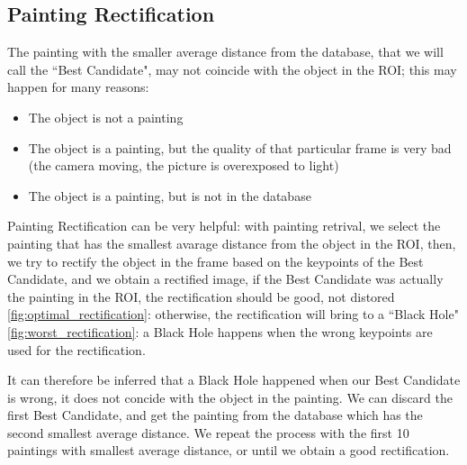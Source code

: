 \documentclass[10pt,twocolumn,letterpaper]{article}
\begin{document}
\subsection{Painting Rectification}
The painting with the smaller average distance from the database, that we will call the ``Best Candidate", may not coincide with the object in the ROI; this may happen for many reasons:
\begin{itemize}
  \item The object is not a painting
  \item The object is a painting, but the quality of that particular frame is very bad (the camera moving, the picture is overexposed to light)
  \item The object is a painting, but is not in the database
\end{itemize}
Painting Rectification can be very helpful: with painting retrival, we select the painting that has the smallest avarage distance from the object in the ROI, then, we try to rectify the object in the frame based on the keypoints of the Best Candidate, and we obtain a rectified image,
if the Best Candidate was actually the painting in the ROI, the rectification should be good, not distored \ref{fig:optimal_rectification}: otherwise, the rectification will bring to a ``Black Hole" \ref{fig:worst_rectification}: a Black Hole happens when the wrong keypoints are used for the rectification.

It can therefore be inferred that a Black Hole happened when our Best Candidate is wrong, it does not concide with the object in the painting.
We can discard the first Best Candidate, and get the painting from the database which has the second smallest average distance.
We repeat the process with the first 10 paintings with smallest average distance, or until we obtain a good rectification.
\end{document}

